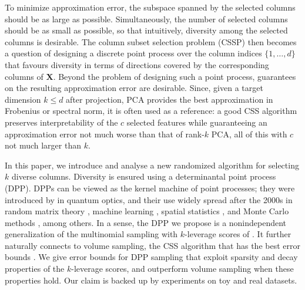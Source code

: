 \documentclass[twoside,11pt]{book}
\numberwithin{theorem}{chapter}
\numberwithin{definition}{chapter}
\numberwithin{proposition}{chapter}
\numberwithin{corollary}{chapter}
\numberwithin{example}{chapter}
\numberwithin{lemma}{chapter}
\numberwithin{assumption}{chapter}
\newcommand{\pc}[1]{\textcolor{blue}{#1}}
\begin{document}
To minimize approximation error, the subspace spanned by the selected columns should be as large as possible. Simultaneously, the number of selected columns should be as small as possible, so that intuitively, diversity among the selected columns is desirable. The column subset selection problem (CSSP) then becomes a question of designing a discrete point process over the column indices $\{1,\dots,d\}$ that favours diversity in terms of directions covered by the corresponding columns of $\bm{X}$.
Beyond the problem of designing such a point process, guarantees on the resulting approximation error are desirable. Since, given a target dimension $k\leq d$ after projection, PCA provides the best approximation in Frobenius or spectral norm, it is often used as a reference: a good CSS algorithm preserves interpretability of the $c$ selected features while guaranteeing an approximation error not much worse than that of rank-$k$ PCA, all of this with $c$ not much larger than $k$.

In this paper, we introduce and analyse a new randomized algorithm for selecting $k$ diverse columns. Diversity is ensured using a determinantal point process (DPP). DPPs can be viewed as the kernel machine of point processes; they were introduced by \cite{Mac75} in quantum optics, and their use widely spread after the 2000s in random matrix theory \citep{Joh05}, machine learning \citep{KuTa12}, spatial statistics \citep{LaMoRu15}, and Monte Carlo methods \citep{BaHa16}, among others. In a sense, the DPP we propose is a nonindependent generalization of the multinomial sampling with $k$-leverage scores of \cite{BoMaDr09}. It further naturally connects to volume sampling, the CSS algorithm that has the best error bounds \citep{DRVW06}. We give error bounds for DPP sampling that exploit sparsity and decay properties of the $k$-leverage scores, and outperform volume sampling when these properties hold. Our claim is backed up by experiments on toy and real datasets.
\end{document}
